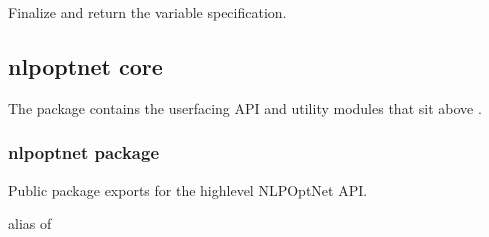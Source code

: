 \documentclass[letterpaper,10pt,english,openany,oneside]{sphinxmanual}
\begin{document}
\begin{fulllineitems}
\begin{fulllineitems}
\end{fulllineitems}


\begin{fulllineitems}
\label{\detokenize{api/core/jaxmodel/variables:jaxmodel.variables.VariableBuilder.build}}
\pysigstartsignatures
{}
\pysigstopsignatures
\sphinxAtStartPar
Finalize and return the variable specification.

\end{fulllineitems}


\end{fulllineitems}


\sphinxstepscope


\subsection{nlpoptnet core}
\label{\detokenize{api/core/nlpoptnet/index:nlpoptnet-core}}\label{\detokenize{api/core/nlpoptnet/index::doc}}
\sphinxAtStartPar
The  package contains the user\sphinxhyphen{}facing API and utility modules that sit above .

\sphinxstepscope


\subsubsection{nlpoptnet package}
\label{\detokenize{api/core/nlpoptnet/module_init:module-nlpoptnet}}\label{\detokenize{api/core/nlpoptnet/module_init:nlpoptnet-package}}\label{\detokenize{api/core/nlpoptnet/module_init::doc}}
\sphinxAtStartPar
Public package exports for the high\sphinxhyphen{}level NLPOptNet API.

\begin{fulllineitems}
\label{\detokenize{api/core/nlpoptnet/module_init:nlpoptnet.ProblemBuilder}}
\pysigstartsignatures
{}
\pysigstopsignatures
\sphinxAtStartPar
alias of {\hyperref[\detokenize{api/package/object:nlpoptnet.api.NLPOptNet}]{}}

\end{fulllineitems}
\end{document}

